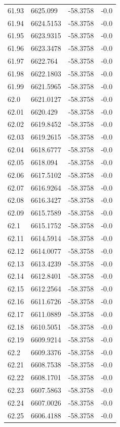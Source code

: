 \begin{table}[H]
\begin{tabular}{llll}
61.93 & 6625.099 & -58.3758 & -0.0 \\
61.94 & 6624.5153 & -58.3758 & -0.0 \\
61.95 & 6623.9315 & -58.3758 & -0.0 \\
61.96 & 6623.3478 & -58.3758 & -0.0 \\
61.97 & 6622.764 & -58.3758 & -0.0 \\
61.98 & 6622.1803 & -58.3758 & -0.0 \\
61.99 & 6621.5965 & -58.3758 & -0.0 \\
62.0 & 6621.0127 & -58.3758 & -0.0 \\
62.01 & 6620.429 & -58.3758 & -0.0 \\
62.02 & 6619.8452 & -58.3758 & -0.0 \\
62.03 & 6619.2615 & -58.3758 & -0.0 \\
62.04 & 6618.6777 & -58.3758 & -0.0 \\
62.05 & 6618.094 & -58.3758 & -0.0 \\
62.06 & 6617.5102 & -58.3758 & -0.0 \\
62.07 & 6616.9264 & -58.3758 & -0.0 \\
62.08 & 6616.3427 & -58.3758 & -0.0 \\
62.09 & 6615.7589 & -58.3758 & -0.0 \\
62.1 & 6615.1752 & -58.3758 & -0.0 \\
62.11 & 6614.5914 & -58.3758 & -0.0 \\
62.12 & 6614.0077 & -58.3758 & -0.0 \\
62.13 & 6613.4239 & -58.3758 & -0.0 \\
62.14 & 6612.8401 & -58.3758 & -0.0 \\
62.15 & 6612.2564 & -58.3758 & -0.0 \\
62.16 & 6611.6726 & -58.3758 & -0.0 \\
62.17 & 6611.0889 & -58.3758 & -0.0 \\
62.18 & 6610.5051 & -58.3758 & -0.0 \\
62.19 & 6609.9214 & -58.3758 & -0.0 \\
62.2 & 6609.3376 & -58.3758 & -0.0 \\
62.21 & 6608.7538 & -58.3758 & -0.0 \\
62.22 & 6608.1701 & -58.3758 & -0.0 \\
62.23 & 6607.5863 & -58.3758 & -0.0 \\
62.24 & 6607.0026 & -58.3758 & -0.0 \\
62.25 & 6606.4188 & -58.3758 & -0.0 \\

\end{tabular}
\end{table}
